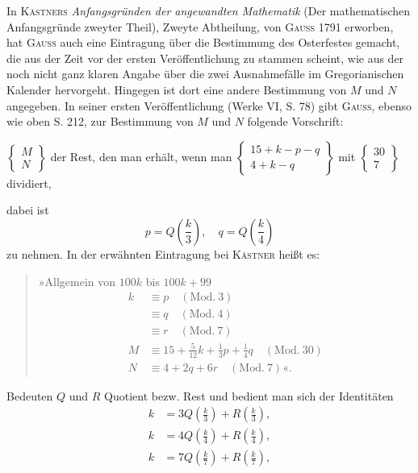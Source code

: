 In \textsc{Kästners} \textit{Anfangsgründen der angewandten Mathematik} (Der mathematischen Anfangsgründe zweyter Theil), Zweyte Abtheilung, von \textsc{Gauss} 1791 erworben, hat \textsc{Gauss} auch eine Eintragung über die Bestimmung des Osterfestes gemacht, die aus der Zeit vor der ersten Veröffentlichung zu stammen scheint, wie aus der noch nicht ganz klaren Angabe über die zwei Ausnahmefälle im Gregorianischen Kalender hervorgeht. Hingegen ist dort eine andere Bestimmung von $M$ und $N$ angegeben. In seiner ersten Veröffentlichung (Werke VI, S. 78) gibt \textsc{Gauss}, ebenso wie oben S. 212, zur Bestimmung von $M$ und $N$ folgende Vorschrift:
\begin{center}
$\left\{\begin{smallmatrix}M\\N\end{smallmatrix}\right\}$ der Rest, den man erhält, wenn man $\left\{\begin{smallmatrix}15+k-p-q\\4+k-q\end{smallmatrix}\right\}$ mit $\left\{\begin{smallmatrix}30\\7\end{smallmatrix}\right\}$ dividiert,
\end{center}
\noindent dabei ist
\[
p=Q\left(\frac{k}{3}\right),\quad q=Q\left(\frac{k}{4}\right)
\]
\noindent zu nehmen. In der erwähnten Eintragung bei \textsc{Kästner} heißt es:
\begin{quote}\normalsize
»Allgemein von $100k$ bis $100k+99$
\[
\begin{aligned}
k&\equiv p\quad(\text{Mod.}\ 3)\\
&\equiv q\quad(\text{Mod.}\ 4)\\
&\equiv r\quad(\text{Mod.}\ 7)\\
M&\equiv15+\tfrac{5}{12}k+\tfrac{1}{3}p+\tfrac{1}{4}q\quad(\text{Mod.}\ 30)\\
N&\equiv4+2q+6r\quad(\text{Mod.}\ 7)\text{«.}
\end{aligned}
\]
\end{quote}
\noindent\hspace*{\parindent}Bedeuten $Q$ und $R$ Quotient bezw. Rest und bedient man sich der Identitäten
\begingroup\makeatletter\tagsleft@true\let\veqno\@@leqno\makeatother
\begin{align}
k&=3Q\left(\frac{k}{3}\right)+R\left(\frac{k}{3}\right),\tag*{(1)}\\
k&=4Q\left(\frac{k}{4}\right)+R\left(\frac{k}{4}\right),\tag*{(2)}\\
k&=7Q\left(\frac{k}{7}\right)+R\left(\frac{k}{7}\right),\tag*{(3)}
\end{align}
